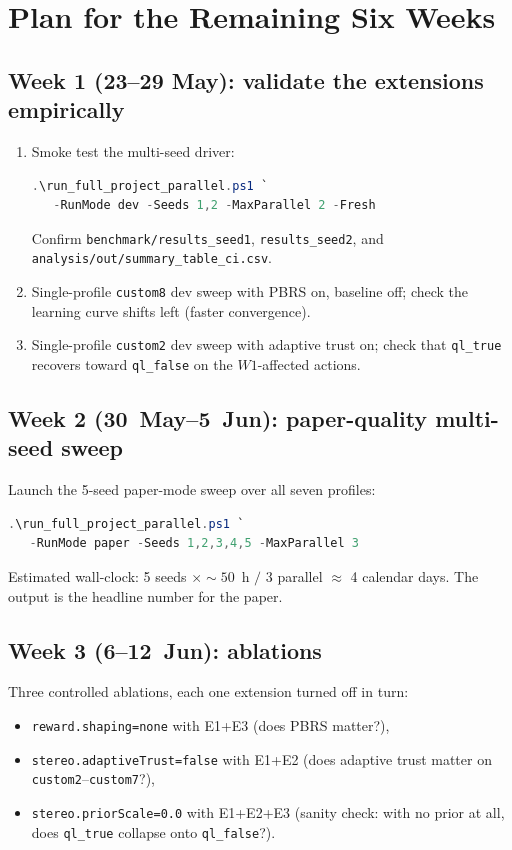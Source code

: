 \documentclass[conference]{IEEEtran}
\begin{document}
\section{Plan for the Remaining Six Weeks}
\label{sec:plan}

\subsection{Week 1 (23--29 May): validate the extensions empirically}

\begin{enumerate}
  \item Smoke test the multi-seed driver:
        \begin{lstlisting}[language=PowerShell]
.\run_full_project_parallel.ps1 `
   -RunMode dev -Seeds 1,2 -MaxParallel 2 -Fresh
        \end{lstlisting}
        Confirm \verb|benchmark/results_seed1|,
        \verb|results_seed2|, and \verb|analysis/out/summary_table_ci.csv|.
  \item Single-profile \verb|custom8| dev sweep with PBRS on, baseline
        off; check the learning curve shifts left (faster
        convergence).
  \item Single-profile \verb|custom2| dev sweep with adaptive trust
        on; check that \verb|ql_true| recovers toward \verb|ql_false|
        on the $W1$-affected actions.
\end{enumerate}

\subsection{Week 2 (30~May--5~Jun): paper-quality multi-seed sweep}
Launch the 5-seed paper-mode sweep over all seven profiles:
\begin{lstlisting}[language=PowerShell]
.\run_full_project_parallel.ps1 `
   -RunMode paper -Seeds 1,2,3,4,5 -MaxParallel 3
\end{lstlisting}
Estimated wall-clock: 5 seeds $\times \sim 50$~h $/$ 3 parallel
$\approx$ 4 calendar days. The output is the headline number for the
paper.

\subsection{Week 3 (6--12~Jun): ablations}
Three controlled ablations, each one extension turned off in turn:
\begin{itemize}
  \item \verb|reward.shaping=none| with E1+E3 (does PBRS matter?),
  \item \verb|stereo.adaptiveTrust=false| with E1+E2 (does adaptive
        trust matter on \texttt{custom2}--\texttt{custom7}?),
  \item \verb|stereo.priorScale=0.0| with E1+E2+E3 (sanity check:
        with no prior at all, does \texttt{ql\_true} collapse onto
        \texttt{ql\_false}?).
\end{itemize}
\end{document}
